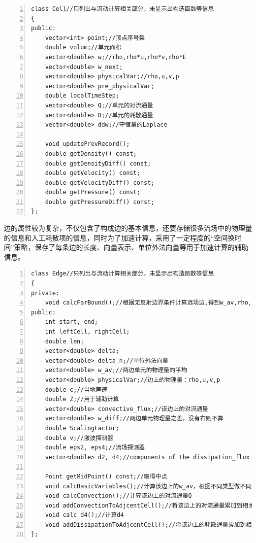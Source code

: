 \documentclass[UTF8]{ctexart}
\begin{document}
\begin{lstlisting}[numbers=left, numberstyle=\tiny, keywordstyle=\color{blue!70}, commentstyle=\color{red!50!green!50!blue!50}, frame=shadowbox, rulesepcolor=\color{red!20!green!20!blue!20}]
class Cell//只列出与流动计算相关部分，未显示出构造函数等信息
{
public:
	vector<int> point;//顶点序号集
	double volum;//单元面积
	vector<double> w;//rho,rho*u,rho*v,rho*E
	vector<double> w_next;
	vector<double> physicalVar;//rho,u,v,p
	vector<double> pre_physicalVar;
	double localTimeStep;
	vector<double> Q;//单元的对流通量
	vector<double> D;//单元的耗散通量
	vector<double> ddw;//守恒量的Laplace

	void updatePrevRecord();
	double getDensity() const;
	double getDensityDiff() const;
	double getVelocity() const;
	double getVelocityDiff() const;
	double getPressure() const;
	double getPressureDiff() const;
};
\end{lstlisting}

\indent 边的属性较为复杂，不仅包含了构成边的基本信息，还要存储很多流场中的物理量的信息和人工耗散项的信息，同时为了加速计算，采用了一定程度的“空间换时间”策略，保存了每条边的长度、向量表示、单位外法向量等用于加速计算的辅助信息。

\begin{lstlisting}[numbers=left, numberstyle=\tiny, keywordstyle=\color{blue!70}, commentstyle=\color{red!50!green!50!blue!50}, frame=shadowbox, rulesepcolor=\color{red!20!green!20!blue!20}]
class Edge//只列出与流动计算相关部分，未显示出构造函数等信息
{
private:
	void calcFarBound();//根据无反射边界条件计算远场边,得到w_av,rho,u,v,p,c
public:
	int start, end;
	int leftCell, rightCell;
	double len;
	vector<double> delta;
	vector<double> delta_n;//单位外法向量
	vector<double> w_av;//两边单元的物理量的平均
	vector<double> physicalVar;//边上的物理量：rho,u,v,p
	double c;//当地声速
	double Z;//用于辅助计算
	vector<double> convective_flux;//该边上的对流通量
	vector<double> w_diff;//两边单元物理量之差，没有右则不算
	double ScalingFactor;
	double v;//激波探测器
	double eps2, eps4;//流场探测器
	vector<double> d2, d4;//components of the dissipation_flux

	Point getMidPoint() const;//取得中点
	void calcBasicVariables();//计算该边上的w_av，根据不同类型做不同处理
	void calcConvection();//计算该边上的对流通量Q
	void addConvectionToAdjcentCell();//将该边上的对流通量累加到相关联的单元
	void calc_d4();//计算d4
	void addDissipationToAdjcentCell();//将该边上的耗散通量累加到相关联的单元
};
\end{lstlisting}
\end{document}
